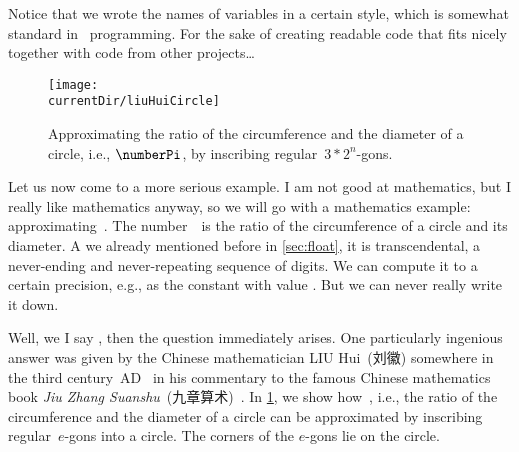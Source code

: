 Notice that we wrote the names of variables in a certain style, which is somewhat standard in \python\ programming.
For the sake of creating readable code that fits nicely together with code from other projects\dots%
%
%
\FloatBarrier%
\endhsection%
%
%
\label{sec:approximatePiLiuHui}%
%
\begin{figure}%
\centering%
\texttt{[image: \\currentDir/liuHuiCircle]}%
\caption{Approximating the ratio of the circumference and the diameter of a circle, i.e., $\numberPi$, by inscribing regular~$3*2^n$-gons.}%
\label{fig:liuHuiCircle}%
\end{figure}%
%
%
\def\liuhuir{\ensuremath{{\color{liuhui-r-color}r}}}%
%
\def\liuhuiss{\ensuremath{{\color{liuhui-s6-color}s_6}}}%
%
\def\liuhuist{\ensuremath{{\color{liuhui-s12-color}s_{12}}}}%
%
\def\liuhuiy{\ensuremath{{\color{liuhui-y-color}y}}}%
%
\def\liuhuix{\ensuremath{{\color{liuhui-x-color}x}}}%
%
\def\liuhuistf{\ensuremath{{\color{liuhui-s24-color}s_{24}}}}%
%
Let us now come to a more serious example.
I am not good at mathematics, but I really like mathematics anyway, so we will go with a mathematics example: approximating~\numberPi.
The number~\numberPi\ is the ratio of the circumference of a circle and its diameter.
A we already mentioned before in \cref{sec:float}, it is transcendental, a never-ending and never-repeating sequence of digits.
We can compute it to a certain precision, e.g., as the  constant  with value .
But we can never really write it down.

Well, we I say , then the question  immediately arises.
One particularly ingenious answer was given by the Chinese mathematician LIU Hui~(刘徽) somewhere in the third century~AD~\cite{OR2003LH} in his commentary to the famous Chinese mathematics book \emph{Jiu Zhang Suanshu}~(九章算术)~\cite{OR2003LH,SCL1999TNCOTMACAC,S1998LHATFGAOCM,D2010AALHOCAS,C2002LFLHADWTDM}.
In \cref{fig:liuHuiCircle}, we show how~\numberPi, i.e., the ratio of the circumference and the diameter of a circle can be approximated by inscribing regular~$e$\nobreakdashes-gons into a circle.
The corners of the $e$\nobreakdashes-gons lie on the circle.

